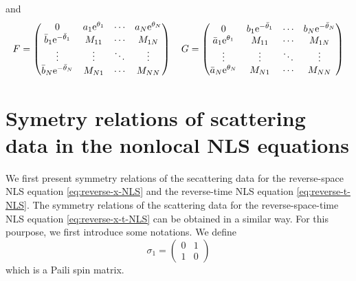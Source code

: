 and 
\begin{equation}
    F = \begin{pmatrix}
        0 & a_{1} \mathrm{e}^{\theta_{1}} & \cdots & a_{N} \mathrm{e}^{\theta_{N}} \\
        \bar{b}_{1} \mathrm{e}^{-\bar{\theta}_{1}} & M_{11} & \cdots & M_{1N} \\
        \vdots & \vdots & \ddots & \vdots \\
        \bar{b}_{N} \mathrm{e}^{-\bar{\theta}_{N}} & M_{N1} & \cdots & M_{NN}
    \end{pmatrix} 
    \quad 
    G = \begin{pmatrix}
        0 & b_{1} \mathrm{e}^{-\bar{\theta}_{1}} & \cdots & b_{N} \mathrm{e}^{-\bar{\theta}_{N}} \\
        \bar{a}_{1} \mathrm{e}^{\theta_{1}} & M_{11} & \cdots & M_{1N} \\
        \vdots & \vdots & \ddots & \vdots \\
        \bar{a}_{N} \mathrm{e}^{\theta_{N}} & M_{N1} & \cdots & M_{NN}
    \end{pmatrix}
\end{equation}
\section{Symetry relations of scattering data in the nonlocal NLS equations}
We first present symmetry relations of the secattering data for the reverse-space NLS equation \eqref{eq:reverse-x-NLS} and the reverse-time NLS equation \eqref{eq:reverse-t-NLS}. The symmetry relations of the scattering data for the reverse-space-time NLS equation \eqref{eq:reverse-x-t-NLS} can be obtained in a similar way. For this pourpose, we first introduce some notations. We define
\begin{equation}
    \sigma_{1} = \begin{pmatrix}
        0 & 1 \\
        1 & 0
    \end{pmatrix}
\end{equation}
which is a Paili spin matrix.

